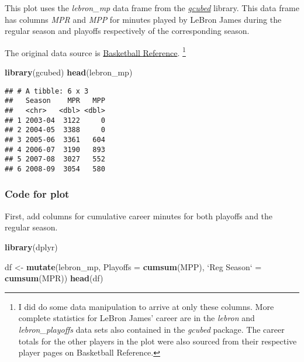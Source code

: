 \documentclass[]{book}
\newenvironment{Shaded}{\begin{snugshade}}{\end{snugshade}}
\newcommand{\DataTypeTok}[1]{\textcolor[rgb]{0.13,0.29,0.53}{#1}}
\newcommand{\KeywordTok}[1]{\textcolor[rgb]{0.13,0.29,0.53}{\textbf{#1}}}
\newcommand{\NormalTok}[1]{#1}
\newcommand{\StringTok}[1]{\textcolor[rgb]{0.31,0.60,0.02}{#1}}
\let\rmarkdownfootnote\footnote%
\def\footnote{\protect\rmarkdownfootnote}
\begin{document}
This plot uses the \emph{lebron\_mp} data frame from the \protect\hyperlink{gcubed}{\emph{gcubed}} library. This data frame has columns \emph{MPR} and \emph{MPP} for minutes played by LeBron James during the regular season and playoffs respectively of the corresponding season.

The original data source is \href{https://www.basketball-reference.com/players/j/jamesle01.html}{Basketball Reference}. \footnote{I did do some data manipulation to arrive at only these columns. More complete statistics for LeBron James' career are in the \emph{lebron} and \emph{lebron\_playoffs} data sets also contained in the \emph{gcubed} package. The career totals for the other players in the plot were also sourced from their respective player pages on Basketball Reference.}

\begin{Shaded}
\begin{Highlighting}[]
\KeywordTok{library}\NormalTok{(gcubed)}
\KeywordTok{head}\NormalTok{(lebron_mp)}
\end{Highlighting}
\end{Shaded}

\begin{verbatim}
## # A tibble: 6 x 3
##   Season    MPR   MPP
##   <chr>   <dbl> <dbl>
## 1 2003-04  3122     0
## 2 2004-05  3388     0
## 3 2005-06  3361   604
## 4 2006-07  3190   893
## 5 2007-08  3027   552
## 6 2008-09  3054   580
\end{verbatim}

\hypertarget{lebroncode}{%
\subsubsection*{Code for plot}\label{lebroncode}}

First, add columns for cumulative career minutes for both playoffs and the regular season.

\begin{Shaded}
\begin{Highlighting}[]
\KeywordTok{library}\NormalTok{(dplyr)}

\NormalTok{df <-}\StringTok{ }\KeywordTok{mutate}\NormalTok{(lebron_mp, }\DataTypeTok{Playoffs =} \KeywordTok{cumsum}\NormalTok{(MPP),}
                    \StringTok{`}\DataTypeTok{Reg Season}\StringTok{`}\NormalTok{ =}\StringTok{ }\KeywordTok{cumsum}\NormalTok{(MPR))}
\KeywordTok{head}\NormalTok{(df)}
\end{Highlighting}
\end{Shaded}
\end{document}
